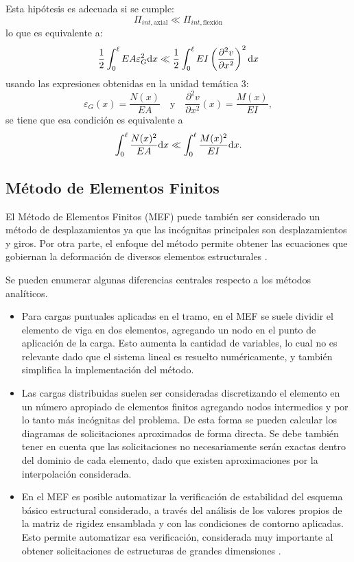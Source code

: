 Esta hipótesis es adecuada si se cumple:
%
\begin{equation}
\Pi_{int,\text{axial}} \ll \Pi_{int,\text{flexión}}
\end{equation}
%
lo que es equivalente a:%
%
\begin{equation}
\frac{1}{2} \int_{0}^{\ell} E A  \varepsilon_G^2 {\text{d}} x \ll \frac{1}{2} \int_{0}^{\ell} EI \left( \frac{\partial^2 v}{\partial x^2}\right)^2 {\text{d}} x
\end{equation}
usando las expresiones obtenidas en la unidad temática 3: 
\begin{equation}
\varepsilon_G(x) = \frac{	N (x) }{E A}
\quad
\text{y}
\quad
\frac{\partial^2 v}{\partial x^2}(x) = \frac{	M (x) }{E I} ,
\end{equation}
se tiene que esa condición es equivalente a 
%
\begin{equation}
\int_{0}^{\ell} \frac{	N (x)^2 }{E A} {\text{d}} x \ll \int_{0}^{\ell} \frac{	M (x)^2 }{E I}  {\text{d}} x.
\end{equation}



\subsection{Método de Elementos Finitos}

El Método de Elementos Finitos (MEF) puede también ser considerado un método de desplazamientos ya que las incógnitas principales son desplazamientos y giros. %
%
Por otra parte, el enfoque del método permite obtener las ecuaciones que gobiernan la deformación de diversos elementos estructurales \citep{Onate2013}.

Se pueden enumerar algunas diferencias centrales respecto a los métodos analíticos.
%
\begin{itemize}
	\item Para cargas puntuales aplicadas en el tramo, en el MEF se suele dividir el elemento de viga en dos elementos, agregando un nodo en el punto de aplicación de la carga. Esto aumenta la cantidad de variables, lo cual no es relevante dado que el sistema lineal es resuelto numéricamente, y también simplifica la implementación del método.
	\item Las cargas distribuidas suelen ser consideradas discretizando el elemento en un número apropiado de elementos finitos agregando nodos intermedios y por lo tanto más incógnitas del problema. De esta forma se pueden calcular los diagramas de solicitaciones aproximados de forma directa. %
	Se debe también tener en cuenta que las solicitaciones no necesariamente serán exactas dentro del dominio de cada elemento, dado que existen aproximaciones por la interpolación considerada.
	\item En el MEF es posible automatizar la verificación de estabilidad del esquema básico estructural considerado, a través del análisis de los valores propios de la matriz de rigidez ensamblada y con las condiciones de contorno aplicadas. %
	Esto permite automatizar esa verificación, considerada muy importante al obtener solicitaciones de estructuras de grandes dimensiones \citep{Kannan2014}. 
\end{itemize}

